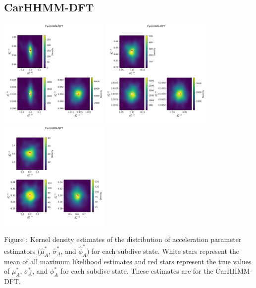 \documentclass{article}
\begin{document}
        \subsection{CarHHMM-DFT}
        \begin{center}
        \includegraphics[width=2.1in]{../Plots/hhmm_FV_MLE_density_A_0_0.png}
        \includegraphics[width=2.1in]{../Plots/hhmm_FV_MLE_density_A_0_1.png}
        \includegraphics[width=2.1in]{../Plots/hhmm_FV_MLE_density_A_0_2.png}
        \end{center}
        
        \noindent Figure : Kernel density estimates of the distribution of acceleration parameter estimators ($\hat \mu^*_A$, $\hat \sigma^*_A$, and $\hat \phi^*_A$) for each subdive state. White stars represent the mean of all maximum likelihood estimates and red stars represent the true values of $\mu^*_A$, $\sigma^*_A$, and $\phi^*_A$ for each subdive state. These estimates are for the CarHHMM-DFT.
        \addtocounter{fignum}{1}
        
\end{document}

